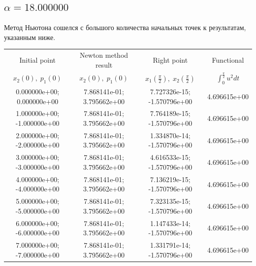 \documentclass[titlepage]{article}
\def\l{\left}
\def\r{\right}
\begin{document}
\subsection{$\alpha = 18.000000$} 
Метод Ньютона сошелся с большого количества начальных точек к результатам, указанным ниже. \\ 
\begin{tabular}{ | c | c | c | c |} 
\hline 
Initial point  & Newton method result & Right point & Functional 
 \\ $x_2(0), \; p_1(0)$ & $x_2(0), \; p_1(0)$ & $x_1\l(\frac{\pi}{2}\r), \; x_2\l(\frac{\pi}{2}\r)$ & $\int_{0}^{\frac{\pi}{2}}u^2dt$  \\ \hline 
0.000000e+00; 0.000000e+00 & 7.868141e-01; 3.795662e+00 & 7.727326e-15; -1.570796e+00 & 4.696615e+00 \\ \hline 
1.000000e+00; -1.000000e+00 & 7.868141e-01; 3.795662e+00 & 7.764189e-15; -1.570796e+00 & 4.696615e+00 \\ \hline 
2.000000e+00; -2.000000e+00 & 7.868141e-01; 3.795662e+00 & 1.334870e-14; -1.570796e+00 & 4.696615e+00 \\ \hline 
3.000000e+00; -3.000000e+00 & 7.868141e-01; 3.795662e+00 & 4.616533e-15; -1.570796e+00 & 4.696615e+00 \\ \hline 
4.000000e+00; -4.000000e+00 & 7.868141e-01; 3.795662e+00 & 7.136219e-15; -1.570796e+00 & 4.696615e+00 \\ \hline 
5.000000e+00; -5.000000e+00 & 7.868141e-01; 3.795662e+00 & 7.323135e-15; -1.570796e+00 & 4.696615e+00 \\ \hline 
6.000000e+00; -6.000000e+00 & 7.868141e-01; 3.795662e+00 & 1.147433e-14; -1.570796e+00 & 4.696615e+00 \\ \hline 
7.000000e+00; -7.000000e+00 & 7.868141e-01; 3.795662e+00 & 1.331791e-14; -1.570796e+00 & 4.696615e+00 \\ \hline 
\end{tabular} 
\end{document}
